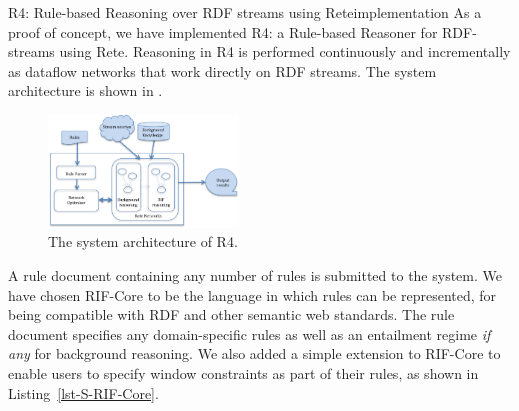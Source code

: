 
\begin{nestedsection}{R4: Rule-based Reasoning over RDF streams using Rete}{implementation}
	As a proof of concept, we have implemented R4: a Rule-based Reasoner for RDF-streams using Rete.
	Reasoning in R4 is performed continuously and incrementally as dataflow networks that work directly on RDF streams.
	The system architecture is shown in .
	\begin{figure}[t]
		\centering
		\includegraphics[width=0.45\textwidth]{R4-architecture}
		\caption{The system architecture of R4.}
	\end{figure}

	A rule document containing any number of rules is submitted to the system.
	We have chosen RIF-Core to be the language in which rules can be represented, for being compatible with RDF and other semantic web standards.
	The rule document specifies any domain-specific rules as well as an entailment regime \emph{if any} for background reasoning.
	We also added a simple extension to RIF-Core to enable users to specify window constraints as part of their rules, as shown in Listing~\ref{lst-S-RIF-Core}.


\end{nestedsection}
